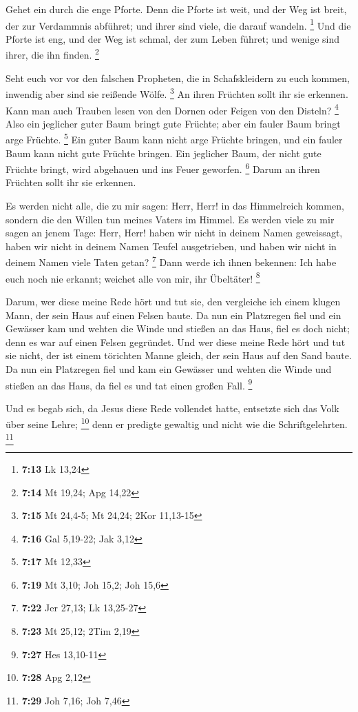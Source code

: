  Gehet ein durch die enge Pforte. Denn die Pforte ist weit,
und der Weg ist breit, der zur Verdammnis abführet; und ihrer sind
viele, die darauf wandeln. \footnote{\textbf{7:13} Lk 13,24}
 Und die Pforte ist eng, und der Weg ist schmal, der zum
Leben führet; und wenige sind ihrer, die ihn finden. \footnote{\textbf{7:14}
  Mt 19,24; Apg 14,22}

 Seht euch vor vor den falschen Propheten, die in
Schafskleidern zu euch kommen, inwendig aber sind sie reißende Wölfe.
\footnote{\textbf{7:15} Mt 24,4-5; Mt 24,24; 2Kor 11,13-15}
 An ihren Früchten sollt ihr sie erkennen. Kann man auch
Trauben lesen von den Dornen oder Feigen von den Disteln? \footnote{\textbf{7:16}
  Gal 5,19-22; Jak 3,12}  Also ein jeglicher guter Baum
bringt gute Früchte; aber ein fauler Baum bringt arge Früchte.
\footnote{\textbf{7:17} Mt 12,33}  Ein guter Baum kann
nicht arge Früchte bringen, und ein fauler Baum kann nicht gute Früchte
bringen.  Ein jeglicher Baum, der nicht gute Früchte
bringt, wird abgehauen und ins Feuer geworfen. \footnote{\textbf{7:19}
  Mt 3,10; Joh 15,2; Joh 15,6}  Darum an ihren Früchten
sollt ihr sie erkennen.

 Es werden nicht alle, die zu mir sagen: Herr, Herr! in das
Himmelreich kommen, sondern die den Willen tun meines Vaters im Himmel.
 Es werden viele zu mir sagen an jenem Tage: Herr, Herr!
haben wir nicht in deinem Namen geweissagt, haben wir nicht in deinem
Namen Teufel ausgetrieben, und haben wir nicht in deinem Namen viele
Taten getan? \footnote{\textbf{7:22} Jer 27,13; Lk 13,25-27}
 Dann werde ich ihnen bekennen: Ich habe euch noch nie
erkannt; weichet alle von mir, ihr Übeltäter! \footnote{\textbf{7:23} Mt
  25,12; 2Tim 2,19}

 Darum, wer diese meine Rede hört und tut sie, den
vergleiche ich einem klugen Mann, der sein Haus auf einen Felsen baute.
 Da nun ein Platzregen fiel und ein Gewässer kam und wehten
die Winde und stießen an das Haus, fiel es doch nicht; denn es war auf
einen Felsen gegründet.  Und wer diese meine Rede hört und
tut sie nicht, der ist einem törichten Manne gleich, der sein Haus auf
den Sand baute.  Da nun ein Platzregen fiel und kam ein
Gewässer und wehten die Winde und stießen an das Haus, da fiel es und
tat einen großen Fall. \footnote{\textbf{7:27} Hes 13,10-11}

 Und es begab sich, da Jesus diese Rede vollendet hatte,
entsetzte sich das Volk über seine Lehre; \footnote{\textbf{7:28} Apg
  2,12}  denn er predigte gewaltig und nicht wie die
Schriftgelehrten. \footnote{\textbf{7:29} Joh 7,16; Joh 7,46}

